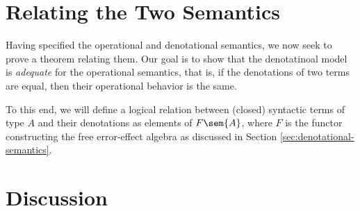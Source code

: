 \documentclass[acmsmall, screen]{acmart}
\theoremstyle{remark}
\newenvironment{DIFnomarkup}{}{}
\newcommand{\bibliographypath}{../../paper-new/references}
\begin{document}
\section{Relating the Two Semantics}\label{sec:relating-the-semantics}

Having specified the operational and denotational semantics, we now seek to
prove a theorem relating them. Our goal is to show that the denotatinoal model
is \emph{adequate} for the operational semantics, that is, if the denotations of
two terms are equal, then their operational behavior is the same.

To this end, we will define a logical relation between (closed) syntactic terms
of type $A$ and their denotations as elements of $F\sem{A}$, where $F$ is the
functor constructing the free error-effect algebra as discussed in Section
\ref{sec:denotational-semantics}.

\section{Discussion}\label{sec:discussion}





\begin{DIFnomarkup}

\end{DIFnomarkup}

\newpage
\appendix
% 
\end{document}
